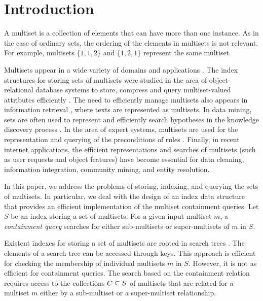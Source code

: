 \documentclass[algorithms,article,accept,pdftex,moreauthors]{Definitions/mdpi}
\begin{document}
\section{Introduction} \label{c:introduction}

A multiset is a collection of elements that can have more than one instance. As in the case of ordinary sets, the ordering of the elements in multisets is not relevant. For example, multisets $\{1,1,2\}$ and $\{1,2,1\}$ represent the same multiset.

Multisets appear in a wide variety of domains and applications \cite{savnik2021plos}. The index structures for storing sets of multisets were studied in the area of object-relational database systems to store, compress and query multiset-valued attributes efficiently \cite{bouros2016set,gripon2012compressing,ross2004symmetric,steinruecken2015compressing}. The need to efficiently manage multisets also appears in information retrieval \cite{zobel1992efficient,zobel2006inverted,manning2008introduction}, where texts are represented as multisets. In data mining, sets are often used to represent and efficiently search hypotheses in the knowledge discovery process \cite{mannila1997,flach1999aicom}. In the area of expert systems, multisets are used for the representation and querying of the preconditions of rules \cite{forgy1982}. Finally, in recent internet applications, the efficient representations and searches of multisets (such as user requests and object features) have become essential \cite{bayardo2007simlar,xiao2011tods,wang2017vldb} for data cleaning, information integration, community mining, and entity resolution. 

In this paper, we address the problems of storing, indexing, and querying the sets of multisets. In particular, we deal with the design of an index data structure that provides an efficient implementation of the multiset containment queries. Let $S$ be an index storing a set of multisets. For a given input multiset $m$, a \emph{containment query} searches for either sub-multisets or super-multisets of $m$ in $S$. 

Existent indexes for storing a set of multisets are rooted in search trees \cite{corman2001}. The elements of a search tree can be accessed through keys. This approach is efficient for checking the membership of individual multisets $m$ in $S$. However, it is not as efficient for  containment queries. The search based on the containment relation requires access to the collections $C\subseteq\/S$ of multisets that are related for a multiset $m$ either by a sub-multiset or a super-multiset relationship. 
\end{document}

